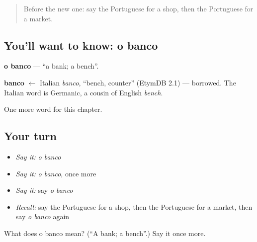 \begin{quote}
Before the new one: say the Portuguese for a shop, then the Portuguese for a market.
\end{quote}

\subsection*{You'll want to know: o banco}
\textbf{o banco} — \textquotedblleft{}a bank; a bench\textquotedblright{}.

\begin{cousinweb}
\textbf{banco} $\leftarrow$ Italian \emph{banco}, \textquotedblleft{}bench, counter\textquotedblright{} (EtymDB 2.1) — borrowed. The Italian word is Germanic, a cousin of English \emph{bench}.
\end{cousinweb}

\begin{grammarlens}[title={What you've built}]
One more word for this chapter.
\end{grammarlens}

\subsection*{Your turn}
\begin{itemize}
\raggedright
  \item \emph{Say it:} \emph{o banco}
  \item \emph{Say it:} \emph{o banco}, once more
  \item \emph{Say it:} say \emph{o banco}
  \item \emph{Recall:} say the Portuguese for a shop, then the Portuguese for a market, then say \emph{o banco} again
\end{itemize}

\begin{tcolorbox}[breakable,colback=teal!4,colframe=teal!35!black,title={Before you move on}]
What does o banco mean? (\textquotedblleft{}A bank; a bench\textquotedblright{}.) Say it once more.
\end{tcolorbox}
